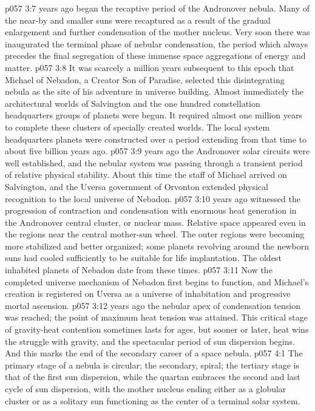 \pc \vs p057 3:7  years ago began the recaptive period of the Andronover nebula. Many of the near\hyp{}by and smaller suns were recaptured as a result of the gradual enlargement and further condensation of the mother nucleus. Very soon there was inaugurated the terminal phase of nebular condensation, the period which always precedes the final segregation of these immense space aggregations of energy and matter.
\vs p057 3:8 It was scarcely a million years subsequent to this epoch that Michael of Nebadon, a Creator Son of Paradise, selected this disintegrating nebula as the site of his adventure in universe building. Almost immediately the architectural worlds of Salvington and the one hundred constellation headquarters groups of planets were begun. It required almost one million years to complete these clusters of specially created worlds. The local system headquarters planets were constructed over a period extending from that time to about five billion years ago.
\pc \vs p057 3:9  years ago the Andronover solar circuits were well established, and the nebular system was passing through a transient period of relative physical stability. About this time the staff of Michael arrived on Salvington, and the Uversa government of Orvonton extended physical recognition to the local universe of Nebadon.
\pc \vs p057 3:10  years ago witnessed the progression of contraction and condensation with enormous heat generation in the Andronover central cluster, or nuclear mass. Relative space appeared even in the regions near the central mother\hyp{}sun wheel. The outer regions were becoming more stabilized and better organized; some planets revolving around the newborn suns had cooled sufficiently to be suitable for life implantation. The oldest inhabited planets of Nebadon date from these times.
\vs p057 3:11 Now the completed universe mechanism of Nebadon first begins to function, and Michael’s creation is registered on Uversa as a universe of inhabitation and progressive mortal ascension.
\pc \vs p057 3:12  years ago the nebular apex of condensation tension was reached; the point of maximum heat tension was attained. This critical stage of gravity\hyp{}heat contention sometimes lasts for ages, but sooner or later, heat wins the struggle with gravity, and the spectacular period of sun dispersion begins. And this marks the end of the secondary career of a space nebula.\plusone
{}
\vs p057 4:1 The primary stage of a nebula is circular; the secondary, spiral; the tertiary stage is that of the first sun dispersion, while the quartan embraces the second and last cycle of sun dispersion, with the mother nucleus ending either as a globular cluster or as a solitary sun functioning as the center of a terminal solar system.
